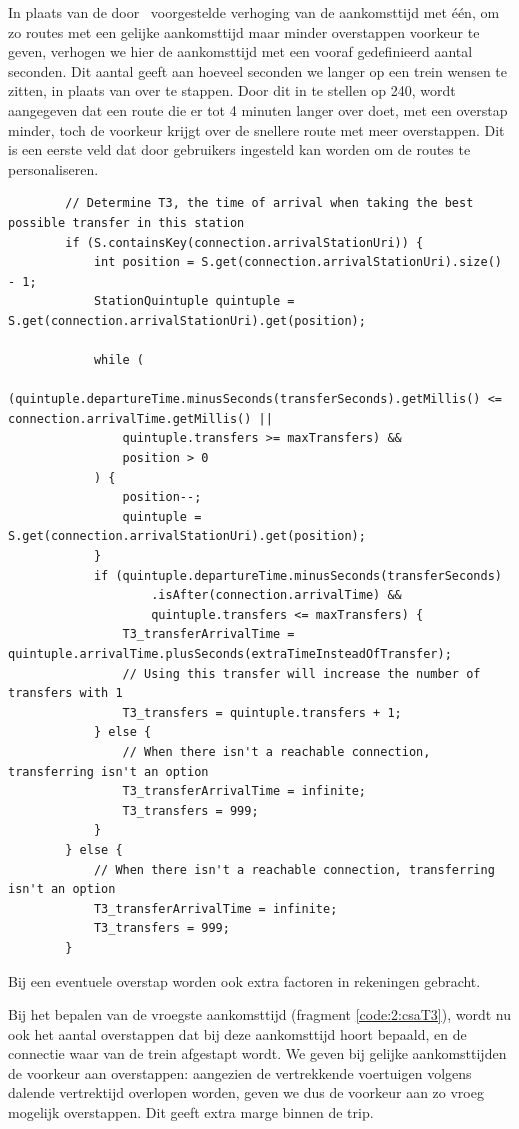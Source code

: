In plaats van de door~\cite{strasser17} voorgestelde verhoging van de aankomsttijd met één, om zo routes met een gelijke aankomsttijd maar minder overstappen voorkeur te geven, verhogen we hier de aankomsttijd met een vooraf gedefinieerd aantal seconden. Dit aantal geeft aan hoeveel seconden we langer op een trein wensen te zitten, in plaats van over te stappen. Door dit in te stellen op 240, wordt aangegeven dat een route die er tot 4 minuten langer over doet, met een overstap minder, toch de voorkeur krijgt over de snellere route met meer overstappen. Dit is een eerste veld dat door gebruikers ingesteld kan worden om de routes te personaliseren.

\begin{code}[h]
	\begin{verbatim}
		// Determine T3, the time of arrival when taking the best possible transfer in this station
		if (S.containsKey(connection.arrivalStationUri)) {
			int position = S.get(connection.arrivalStationUri).size() - 1;
			StationQuintuple quintuple = S.get(connection.arrivalStationUri).get(position);
		
			while (
				(quintuple.departureTime.minusSeconds(transferSeconds).getMillis() <= connection.arrivalTime.getMillis() ||
				quintuple.transfers >= maxTransfers) &&  
				position > 0
			) {
				position--;
				quintuple = S.get(connection.arrivalStationUri).get(position);
			}
			if (quintuple.departureTime.minusSeconds(transferSeconds)
					.isAfter(connection.arrivalTime) && 
					quintuple.transfers <= maxTransfers) {
				T3_transferArrivalTime = quintuple.arrivalTime.plusSeconds(extraTimeInsteadOfTransfer);
				// Using this transfer will increase the number of transfers with 1
				T3_transfers = quintuple.transfers + 1;
			} else {
				// When there isn't a reachable connection, transferring isn't an option
				T3_transferArrivalTime = infinite;
				T3_transfers = 999;
			}
		} else {
			// When there isn't a reachable connection, transferring isn't an option
			T3_transferArrivalTime = infinite;
			T3_transfers = 999;
		}
		\end{verbatim}
						\caption[CSA: Bepalen van aankomsttijden]{Bij een eventuele overstap worden ook extra factoren in rekeningen gebracht.}
		\label{code:2:csaT3}
\end{code}
Bij het bepalen van de vroegste aankomsttijd (fragment \ref{code:2:csaT3}), wordt nu ook het aantal overstappen dat bij deze aankomsttijd hoort bepaald, en de connectie waar van de trein afgestapt wordt. We geven bij gelijke aankomsttijden de voorkeur aan overstappen: aangezien de vertrekkende voertuigen volgens dalende vertrektijd overlopen worden, geven we dus de voorkeur aan zo vroeg mogelijk overstappen. Dit geeft extra marge binnen de trip.
